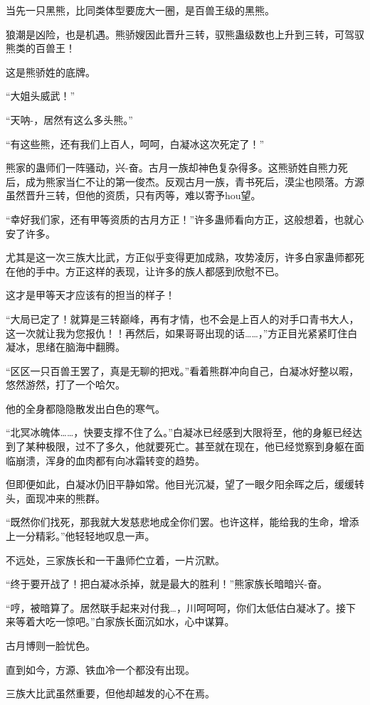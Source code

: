 \begin{this_body}
当先一只黑熊，比同类体型要庞大一圈，是百兽王级的黑熊。

狼潮是凶险，也是机遇。熊骄嫂因此晋升三转，驭熊蛊级数也上升到三转，可驾驭熊类的百兽王！

这是熊骄姓的底牌。

“大姐头威武！”

“天呐-，居然有这么多头熊。”

“有这些熊，还有我们上百人，呵呵，白凝冰这次死定了！”

熊家的蛊师们一阵骚动，兴-奋。古月一族却神色复杂得多。这熊骄姓自熊力死后，成为熊家当仁不让的第一俊杰。反观古月一族，青书死后，漠尘也陨落。方源虽然晋升三转，但他的资质，只有丙等，难以寄予hou望。

“幸好我们家，还有甲等资质的古月方正！”许多蛊师看向方正，这般想着，也就心安了许多。

尤其是这一次三族大比武，方正似乎变得更加成熟，攻势凌厉，许多白家蛊师都死在他的手中。方正这样的表现，让许多的族人都感到欣慰不已。

这才是甲等天才应该有的担当的样子！

“大局已定了！就算是三转巅峰，再有才情，也不会是上百人的对手口青书大人，这一次就让我为您报仇！！再然后，如果哥哥出现的话……，”方正目光紧紧盯住白凝冰，思绪在脑海中翻腾。

“区区一只百兽王罢了，真是无聊的把戏。”看着熊群冲向自己，白凝冰好整以暇，悠然游然，打了一个哈欠。

他的全身都隐隐散发出白色的寒气。

“北冥冰魄体……，快要支撑不住了么。”白凝冰已经感到大限将至，他的身躯已经达到了某种极限，过不了多久，他就要死亡。甚至就在现在，他已经觉察到身躯在面临崩溃，浑身的血肉都有向冰霜转变的趋势。

但即便如此，白凝冰仍旧平静如常。他目光沉凝，望了一眼夕阳余晖之后，缓缓转头，面现冲来的熊群。

“既然你们找死，那我就大发慈悲地成全你们罢。也许这样，能给我的生命，增添上一分精彩。”他轻轻地叹息一声。

不远处，三家族长和一干蛊师伫立着，一片沉默。

“终于要开战了！把白凝冰杀掉，就是最大的胜利！”熊家族长暗暗兴-奋。

“哼，被暗算了。居然联手起来对付我…，川呵呵呵，你们太低估白凝冰了。接下来等着大吃一惊吧。”白家族长面沉如水，心中谋算。

古月博则一脸忧色。

直到如今，方源、铁血冷一个都没有出现。

三族大比武虽然重要，但他却越发的心不在焉。


\end{this_body}

